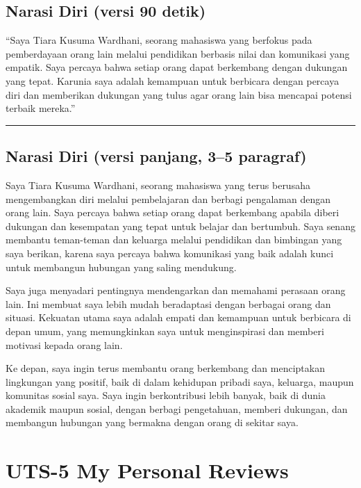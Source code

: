 \documentclass[
  letterpaper,
  DIV=11,
  numbers=noendperiod]{scrreprt}
\begin{document}
\section{Narasi Diri (versi 90 detik)}\label{narasi-diri-versi-90-detik}

``Saya Tiara Kusuma Wardhani, seorang mahasiswa yang berfokus pada
pemberdayaan orang lain melalui pendidikan berbasis nilai dan komunikasi
yang empatik. Saya percaya bahwa setiap orang dapat berkembang dengan
dukungan yang tepat. Karunia saya adalah kemampuan untuk berbicara
dengan percaya diri dan memberikan dukungan yang tulus agar orang lain
bisa mencapai potensi terbaik mereka.''

\begin{center}\rule{0.5\linewidth}{0.5pt}\end{center}

\section{Narasi Diri (versi panjang, 3--5
paragraf)}\label{narasi-diri-versi-panjang-35-paragraf}

Saya Tiara Kusuma Wardhani, seorang mahasiswa yang terus berusaha
mengembangkan diri melalui pembelajaran dan berbagi pengalaman dengan
orang lain. Saya percaya bahwa setiap orang dapat berkembang apabila
diberi dukungan dan kesempatan yang tepat untuk belajar dan bertumbuh.
Saya senang membantu teman-teman dan keluarga melalui pendidikan dan
bimbingan yang saya berikan, karena saya percaya bahwa komunikasi yang
baik adalah kunci untuk membangun hubungan yang saling mendukung.

Saya juga menyadari pentingnya mendengarkan dan memahami perasaan orang
lain. Ini membuat saya lebih mudah beradaptasi dengan berbagai orang dan
situasi. Kekuatan utama saya adalah empati dan kemampuan untuk berbicara
di depan umum, yang memungkinkan saya untuk menginspirasi dan memberi
motivasi kepada orang lain.

Ke depan, saya ingin terus membantu orang berkembang dan menciptakan
lingkungan yang positif, baik di dalam kehidupan pribadi saya, keluarga,
maupun komunitas sosial saya. Saya ingin berkontribusi lebih banyak,
baik di dunia akademik maupun sosial, dengan berbagi pengetahuan,
memberi dukungan, dan membangun hubungan yang bermakna dengan orang di
sekitar saya.


\chapter{UTS-5 My Personal Reviews}\label{uts-5-my-personal-reviews}
\end{document}
